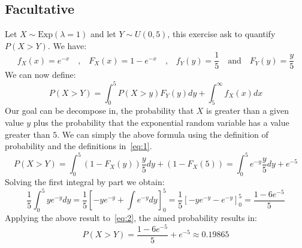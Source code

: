 \documentclass[10pt,a4paper]{article}
\begin{document}
\subsection*{Facultative}

Let \(X\sim\text{Exp}(\lambda = 1)\) and let \(Y\sim U(0,5)\), this exercise ask to quantify \(P(X>Y)\). We have:
\begin{equation}
  \label{eq:1}
  f_{X}(x) = e^{-x} \quad\textrm{,}\quad F_{X}(x) = 1 - e^{-x} \quad\textrm{,}\quad f_{Y}(y)=\frac{1}{5}  \quad\textrm{and}\quad F_{Y}(y) = \frac{y}{5}
\end{equation}
We can now define:
\begin{equation*}
  P(X>Y) = \int^{5}_{0}{P(X>y)F_{Y}(y)dy} + \int^{\infty}_{5}{f_{X}(x)dx}
\end{equation*}
Our goal can be decompose in, the probability that \(X\) is greater than a given value \(y\) plus the probability that the exponential random variable has a value greater than \(5\). We can simply the above formula using the definition of probability and the definitions in~\ref{eq:1}.
\begin{equation}
  \label{eq:2}
  P(X>Y) = \int^{5}_{0}{(1 - F_{X}(y))\frac{y}{5}}dy + (1 - F_{X}(5)) = \int^{5}_{0}{e^{-y}\frac{y}{5}}dy + e^{-5}
\end{equation}
Solving the first integral by part we obtain:
\begin{equation*}
  \frac{1}{5}\int^{5}_{0}{ye^{-y}}dy = \frac{1}{5}\left[-ye^{-y} + \int{e^{-y}}dy\right]_{0}^{5} = \frac{1}{5}\left[-ye^{-y} - e^{-y}\right]_{0}^{5} = \frac{1-6e^{-5}}{5}
\end{equation*}
Applying the above result to~\ref{eq:2}, the aimed probability results in:
\begin{equation*}
  P(X>Y) = \frac{1-6e^{-5}}{5} + e^{-5} \approx 0.19865 
\end{equation*}
\end{document}
